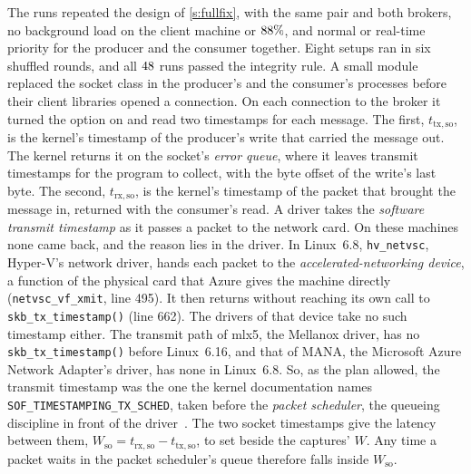 \documentclass[10pt,journal,onecolumn]{IEEEtran}
\begin{document}
The runs repeated the design of \ref{s:fullfix}, with the same pair and both brokers, no
background load on the client machine or $88\%$, and normal or real-time priority for
the producer and the consumer together. Eight setups ran in six shuffled rounds, and all
$48$ runs passed the integrity rule. A small module replaced the socket class in the
producer's and the consumer's processes before their client libraries opened a connection. On
each connection to the broker it turned the option on and read two timestamps for each message.
The first, $t_{\mathrm{tx,so}}$, is the kernel's timestamp of the producer's write that carried
the message out. The kernel returns it on the socket's \emph{error queue}, where it leaves
transmit timestamps for the program to collect, with the byte offset of the write's last byte. The
second, $t_{\mathrm{rx,so}}$, is the kernel's timestamp of the packet that brought the message in,
returned with the consumer's read. A driver takes the \emph{software transmit timestamp} as it
passes a packet to the network card. On these machines none came back, and the reason lies in the
driver. In Linux~6.8, \texttt{hv\_netvsc}, Hyper-V's network driver, hands each packet to the
\emph{accelerated-networking device}, a function of the physical card that Azure gives the machine
directly (\texttt{netvsc\_vf\_xmit},  line 495). It then
returns without reaching its own call to \texttt{skb\_tx\_timestamp()} (line 662). The drivers of
that device take no such timestamp either. The transmit path of mlx5, the Mellanox driver, has no
\texttt{skb\_tx\_timestamp()} before Linux~6.16, and that of MANA, the Microsoft Azure Network
Adapter's driver, has none in Linux~6.8. So, as the plan allowed, the transmit timestamp was the
one the kernel documentation names \texttt{SOF\_TIMESTAMPING\_TX\_SCHED}, taken before the
\emph{packet scheduler}, the queueing discipline in front of the driver~\cite{linux_timestamping}.
The two socket timestamps give the latency between them, $W_{\mathrm{so}} = t_{\mathrm{rx,so}} -
t_{\mathrm{tx,so}}$, to set beside the captures' $W$. Any time a packet waits in the packet
scheduler's queue therefore falls inside $W_{\mathrm{so}}$.

\begin{table}[tb]
\caption{\textbf{Read on the clients' sockets, the latency between the kernel's timestamps matched the captures'.} One row
for each broker, background load on the client machine, and priority of the producer and the
consumer together. $W$ is the latency between the captures' kernel timestamps, and $W_{\mathrm{so}}$ the
same latency from the sockets. $D$ runs from the publish call to the consumer's timestamp. Each
figure is a setup's median over its six runs of each run's statistic, in microseconds.}
\label{stab:sofix}
\centering
\footnotesize

\end{table}
\end{document}
